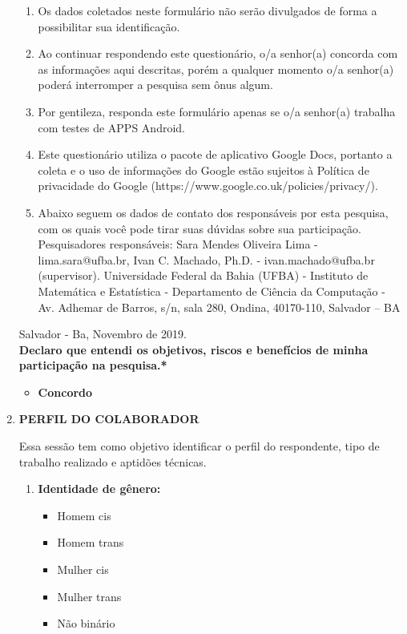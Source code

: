 \begin{enumerate}[label=\bf A\arabic*,leftmargin=1.8cm]
\begin{enumerate}[label= \arabic*]
        \item Os dados coletados neste formulário não serão divulgados de forma a possibilitar sua identificação.
        \item Ao continuar respondendo este questionário, o/a senhor(a) concorda com as informações aqui descritas, porém a qualquer momento o/a senhor(a) poderá interromper a pesquisa sem ônus algum.
        \item Por gentileza, responda este formulário apenas se o/a senhor(a) trabalha com testes de \ac{APPS} Android.
        \item Este questionário utiliza o pacote de aplicativo Google Docs, portanto a coleta e o uso de informações do Google estão sujeitos à Política de privacidade do Google (https://www.google.co.uk/policies/privacy/).
        \item Abaixo seguem os dados de contato dos responsáveis por esta pesquisa, com os quais você pode tirar suas dúvidas sobre sua participação. Pesquisadores responsáveis: Sara Mendes Oliveira Lima - lima.sara@ufba.br, Ivan C. Machado, Ph.D. - ivan.machado@ufba.br (supervisor). Universidade Federal da Bahia (UFBA) - Instituto de Matemática e Estatística - Departamento de Ciência da Computação - Av. Adhemar de Barros, s/n, sala 280, Ondina, 40170-110, Salvador – BA
    \end{enumerate}
    
    
    Salvador - Ba, Novembro de 2019.\\
    
    
    
    \textbf{Declaro que entendi os objetivos, riscos e benefícios de minha participação na pesquisa.*}

    \begin{itemize}
        \item \textbf{Concordo}
    \end{itemize}
    
    

    \item \textbf{PERFIL DO COLABORADOR}
    
    Essa sessão tem como objetivo identificar o perfil do respondente, tipo de trabalho realizado e aptidões técnicas.
    
     \begin{enumerate}[label= \arabic*]
     
        \item \textbf{Identidade de gênero:}
        \begin{itemize}
            \item Homem cis
            \item Homem trans
            \item Mulher cis
            \item Mulher trans
            \item Não binário
        \end{itemize}
        

\end{enumerate}
\end{enumerate}

